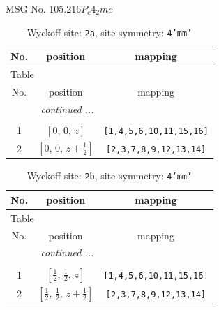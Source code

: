 \documentclass[fleqn,8pt]{jsarticle}
\begin{document}
\setcounter{MaxMatrixCols}{32}

\renewcommand{\tablename}{Table~}
\renewcommand{\figurename}{Figure~}
\begin{center}
\LARGE
MSG No. 105.216\quad$P_{c}4_{2}mc$
\end{center}
\renewcommand{\arraystretch}{1.2}
\begin{longtable}{ccc}
\caption{Wyckoff site: {\tt 2a}, site symmetry: {\tt 4'mm'}}
 \\
 \hline \hline
No. & position & mapping \\ \hline \endfirsthead

\multicolumn{2}{l}{\tablename\ \thetable{}} \\
 \hline \hline
No. & position & mapping \\ \hline \endhead

 \hline \hline
\multicolumn{2}{r}{\footnotesize\it continued ...} \\ \endfoot

 \hline \hline
\multicolumn{2}{r}{} \\ \endlastfoot

1 & $\left[ 0,\, 0,\, z \right]$ & {\tt [1,4,5,6,10,11,15,16]} \\ \hline
2 & $\left[ 0,\, 0,\, z + \frac{1}{2} \right]$ & {\tt [2,3,7,8,9,12,13,14]} \\
\end{longtable}
\renewcommand{\arraystretch}{1.2}
\begin{longtable}{ccc}
\caption{Wyckoff site: {\tt 2b}, site symmetry: {\tt 4'mm'}}
 \\
 \hline \hline
No. & position & mapping \\ \hline \endfirsthead

\multicolumn{2}{l}{\tablename\ \thetable{}} \\
 \hline \hline
No. & position & mapping \\ \hline \endhead

 \hline \hline
\multicolumn{2}{r}{\footnotesize\it continued ...} \\ \endfoot

 \hline \hline
\multicolumn{2}{r}{} \\ \endlastfoot

1 & $\left[ \frac{1}{2},\, \frac{1}{2},\, z \right]$ & {\tt [1,4,5,6,10,11,15,16]} \\ \hline
2 & $\left[ \frac{1}{2},\, \frac{1}{2},\, z + \frac{1}{2} \right]$ & {\tt [2,3,7,8,9,12,13,14]} \\
\end{longtable}
\end{document}
